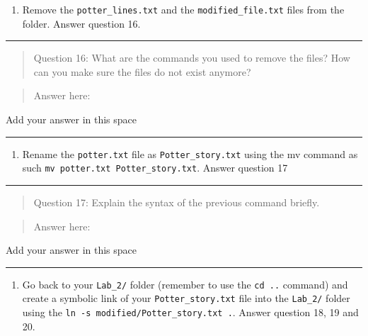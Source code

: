\documentclass[
]{book}
\providecommand{\tightlist}{%
  \setlength{\itemsep}{0pt}\setlength{\parskip}{0pt}}
\begin{document}
\begin{enumerate}
\def\labelenumi{\arabic{enumi}.}
\tightlist
\item
  Remove the \texttt{potter\_lines.txt} and the \texttt{modified\_file.txt} files from the folder. Answer question 16.
\end{enumerate}

\begin{center}\rule{0.5\linewidth}{0.5pt}\end{center}

\begin{quote}
Question 16: What are the commands you used to remove the files? How can you make sure the files do not exist anymore?
\end{quote}

\begin{quote}
Answer here:
\end{quote}

{Add your answer in this space}

\begin{center}\rule{0.5\linewidth}{0.5pt}\end{center}

\begin{enumerate}
\def\labelenumi{\arabic{enumi}.}
\setcounter{enumi}{1}
\tightlist
\item
  Rename the \texttt{potter.txt} file as \texttt{Potter\_story.txt} using the mv command as such \texttt{mv\ potter.txt\ Potter\_story.txt}. Answer question 17
\end{enumerate}

\begin{center}\rule{0.5\linewidth}{0.5pt}\end{center}

\begin{quote}
Question 17: Explain the syntax of the previous command briefly.
\end{quote}

\begin{quote}
Answer here:
\end{quote}

{Add your answer in this space}

\begin{center}\rule{0.5\linewidth}{0.5pt}\end{center}

\begin{enumerate}
\def\labelenumi{\arabic{enumi}.}
\setcounter{enumi}{2}
\tightlist
\item
  Go back to your \texttt{Lab\_2/} folder (remember to use the \texttt{cd\ ..} command) and create a symbolic link of your \texttt{Potter\_story.txt} file into the \texttt{Lab\_2/} folder using the \texttt{ln\ -s\ modified/Potter\_story.txt\ .}. Answer question 18, 19 and 20.
\end{enumerate}
\end{document}
